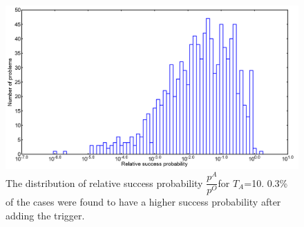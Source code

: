 \documentclass[12]{article}
\begin{document}
\begin{figure}[H]
\centering 
\includegraphics[scale=0.3]{A_T1000_g0.png}
\caption{The distribution of relative success probability $\dfrac{p^A}{p^O}$for $T_A$=10. 0.3\% of the cases were found to have a higher success probability after adding the trigger.}
\label{fig:a12}
\end{figure}
\end{document}
